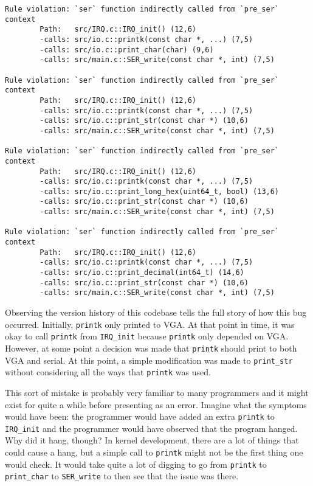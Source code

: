 \noindent\begin{minipage}[t]{\linewidth}
\begin{lstlisting}[caption={Output from funqual when run on simple OS kernel},label={lst:app:pre-malloc:output}]
Rule violation: `ser` function indirectly called from `pre_ser` context
        Path:   src/IRQ.c::IRQ_init() (12,6)
        -calls: src/io.c::printk(const char *, ...) (7,5)
        -calls: src/io.c::print_char(char) (9,6)
        -calls: src/main.c::SER_write(const char *, int) (7,5)

Rule violation: `ser` function indirectly called from `pre_ser` context
        Path:   src/IRQ.c::IRQ_init() (12,6)
        -calls: src/io.c::printk(const char *, ...) (7,5)
        -calls: src/io.c::print_str(const char *) (10,6)
        -calls: src/main.c::SER_write(const char *, int) (7,5)

Rule violation: `ser` function indirectly called from `pre_ser` context
        Path:   src/IRQ.c::IRQ_init() (12,6)
        -calls: src/io.c::printk(const char *, ...) (7,5)
        -calls: src/io.c::print_long_hex(uint64_t, bool) (13,6)
        -calls: src/io.c::print_str(const char *) (10,6)
        -calls: src/main.c::SER_write(const char *, int) (7,5)

Rule violation: `ser` function indirectly called from `pre_ser` context
        Path:   src/IRQ.c::IRQ_init() (12,6)
        -calls: src/io.c::printk(const char *, ...) (7,5)
        -calls: src/io.c::print_decimal(int64_t) (14,6)
        -calls: src/io.c::print_str(const char *) (10,6)
        -calls: src/main.c::SER_write(const char *, int) (7,5)
\end{lstlisting}
\end{minipage}

Observing the version history of this codebase tells the full story of how this bug occurred.  Initially, \lstinline{printk} only printed to VGA.  At that point in time, it was okay to call \lstinline{printk} from \lstinline{IRQ_init} because \lstinline{printk} only depended on VGA.  However, at some point a decision was made that \lstinline{printk} should print to both VGA and serial.  At this point, a simple modification was made to \lstinline{print_str} without considering all the ways that \lstinline{printk} was used. 

This sort of mistake is probably very familiar to many programmers and it might exist for quite a while before presenting as an error.  Imagine what the symptoms would have been: the programmer would have added an extra \lstinline{printk} to \lstinline{IRQ_init} and the programmer would have observed that the program hanged.  Why did it hang, though?  In kernel development, there are a lot of things that could cause a hang, but a simple call to \lstinline{printk} might not be the first thing one would check.  It would take quite a lot of digging to go from \lstinline{printk} to \lstinline{print_char} to \lstinline{SER_write} to then see that the issue was there.  

